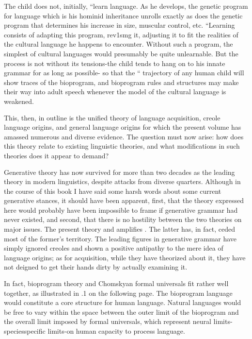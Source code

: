 The child does not, initially, ``learn language. As he develops,
the genetic program for language which is his hominid inheritance unrolls exactly as does the genetic program that determines his increase
in size, muscular control, etc. ``Learning consists of adapting this program, rev1smg it, adjusting it to fit the realities of the cultural language he happens to encounter. Without such a program, the sim\-plest of cultural languages would presumably be quite unlearnable. But the  process is not without its tensions-the child tends to hang on to his innate grammar for as long as possible- so that the `` trajectory of any human child will show traces of the bioprogram, and bioprogram rules and structures may make their way into adult speech whenever the model of the cultural language is weakened.

This, then, in outline is the unified theory of language acquisi\-tion, creole language origins, and general language origins for which the present volume has amassed numerous and diverse  evi\-dence. The question must now arise: how does this theory relate to existing linguistic theories, and what modifications in such theories does it appear to demand?

Generative theory has now survived for more than two decades as the leading theory in modern linguistics, despite attacks from diverse quarters. Although in the course of this book I have said some harsh words about some current generative stances, it should have been apparent, first, that the theory expressed here would probably have been impossible to frame if generative grammar had never existed, and second, that there is no hostility between the two theories on major issues. The present theory  and amplifies . The latter has, in fact, ceded most of the former's territory. The leading figures in generative grammar have simply ignored creoles and shown a positive antipathy to the mere idea of language origins; as for acquisition, while they have theorized about it, they have not deigned to get their hands dirty by actually examining it.

In fact, bioprogram theory and Chomskyan formal universals fit rather well together, as illustrated in .1 on the following page. The bioprogram language would constitute a core structure for human language. Natural languages would be free to vary within the space between the outer limit of the bioprogram and the overall limit
imposed by formal universals, which represent neural limits-species\-specific limits-on human capacity to process language.

